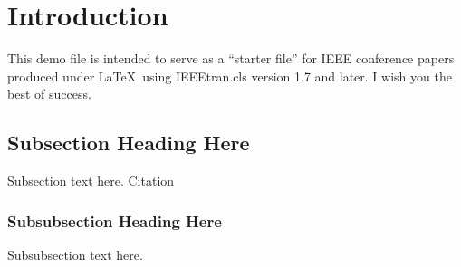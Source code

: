 \documentclass[conference]{IEEEtran}
\begin{document}




\maketitle


\begin{abstract}
The abstract goes here.
\end{abstract}





%
\IEEEpeerreviewmaketitle



\section{Introduction}
This demo file is intended to serve as a ``starter file''
for IEEE conference papers produced under \LaTeX\ using
IEEEtran.cls version 1.7 and later.
I wish you the best of success.

 

\subsection{Subsection Heading Here}
Subsection text here. Citation \cite{A2}


\subsubsection{Subsubsection Heading Here}
Subsubsection text here.
\end{document}
